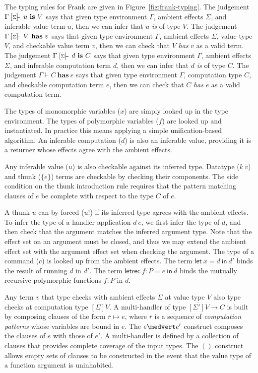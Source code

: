 \documentclass[preprint]{sigplanconf}
\newcommand{\many}{\overline}
\newcommand{\judgeword}[1]{~\mathbf{#1}~}
\newcommand{\sigentails}[1]{\mathbin{[{\text{\scriptsize ${#1}$}}]\!\text{-\!-}}\,}
\newcommand{\makes}[4]  {#1 \sigentails{#2} {#3} \judgeword{is} {#4}}
\newcommand{\has}[4] {#1 \sigentails{#2} {#3} \judgeword{has} {#4}}
\newcommand{\can}[4]{#1 \sigentails{#2} {#3} \judgeword{is} {#4}}
\newcommand{\does}[3]{#1 \vdash {#2} \judgeword{has} {#3}}
\newcommand{\makesgs}{\makes{\Gamma}{\sigs}}
\newcommand{\hasgs}{\has{\Gamma}{\sigs}}
\newcommand{\cangs}{\can{\Gamma}{\sigs}}
\newcommand{\doesg}{\does{\Gamma}}
\newcommand{\sigs}{\Sigma}
\newcommand{\effbox}[1]{[#1]}
\newcommand{\key}[1]{\mathsf{#1}}
\newcommand{\thunk}[1]{\{{#1}\}}
\begin{document}
The typing rules for Frank are given in Figure~\ref{fig:frank-typing}.
%
The judgement $\makesgs{u}{V}$ says that given type environment
$\Gamma$, ambient effects $\sigs$, and inferable value term $u$, then
we can infer that $u$ \emph{is} of type $V$.
%
The judgement $\hasgs{V}{v}$ says that given type environment
$\Gamma$, ambient effects $\sigs$, value type $V$, and checkable
value term $v$, then we can check that $V$ \emph{has} $v$ as a valid term.
%
The judgement $\cangs{d}{C}$ says that given type environment
$\Gamma$, ambient effects $\sigs$, and inferable computation term $d$,
then we can infer that $d$ \emph{is} of type $C$.
%
The judgement $\doesg{C}{e}$ says that given type environment
$\Gamma$, computation type $C$, and checkable computation term $e$,
then we can check that $C$ \emph{has} $e$ as a valid computation term.

The types of monomorphic variables ($x$) are simply looked up in the
type environment. The types of polymorphic variables ($f$) are looked
up and instantiated. In practice this means applying a simple
unification-based algorithm.
%
An inferable computation ($d$) is also an inferable value, providing
it is a returner whose effects agree with the ambient effects.

Any inferable value ($u$) is also checkable against its inferred
type. Datatype ($k~\many{v}$) and thunk ($\thunk{e}$) terms are
checkable by checking their components. The side condition on the
thunk introduction rule requires that the pattern matching clauses of
$e$ be complete with respect to the type $C$ of $e$.

A thunk $u$ can by forced ($u!$) if its inferred type agrees with the
ambient effects. To infer the type of a handler application $d~e$, we
first infer the type of $d$, and then check that the argument matches
the inferred argument type. Note that the effect set on an argument
must be closed, and thus we may extend the ambient effect set with the
argument effect set when checking the argument.
%
The type of a command ($c$) is looked up from the ambient effects.
%
The term $\key{let}~x=d~\key{in}~d'$ binds the result of running $d$
in $d'$.
%
The term $\key{letrec}~\many{f : P = e}~\key{in}~d$ binds the mutually
recursive polymorphic functions $\many{f:P}$ in $d$.

Any term $v$ that type checks with ambient effects $\sigs$ at value
type $V$ also type checks at computation type $\effbox{\sigs}V$.
%
A multi-handler of type $\many{\effbox{\sigs'}V} \to C$ is built by
composing clauses of the form $\many{r} \mapsto e$, where $\many{r}$
is a sequence of \emph{computation patterns} whose variables are bound
in $e$.
%
The $e \medvert e'$ construct composes the clauses of $e$ with those
of $e'$. A multi-handler is defined by a collection of clauses that
provides complete coverage of the input types.
%
The $()$ construct allows empty sets of clauses to be constructed in
the event that the value type of a function argument is uninhabited.
\end{document}
